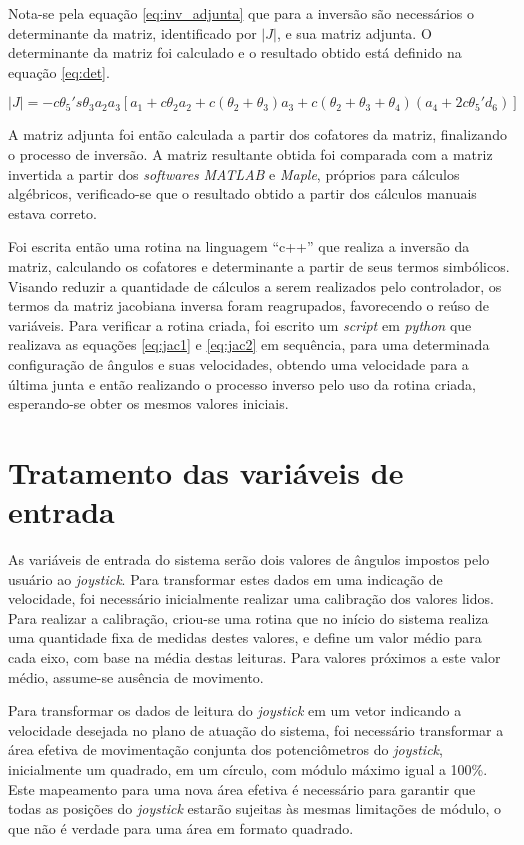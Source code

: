 Nota-se pela equação \ref{eq:inv_adjunta} que para a inversão são necessários o determinante da matriz,
identificado por $|J|$, e sua matriz adjunta. O determinante da matriz foi calculado e o resultado obtido
está definido na equação \ref{eq:det}.

\begin{equation}
    \label{eq:det}
    |J| = -c\theta_5's\theta_3a_2a_3[a_1+c\theta_2a_2+c(\theta_2+\theta_3)a_3+c(\theta_2+\theta_3+\theta_4)(a_4+2c\theta_5'd_6)]  
\end{equation}

A matriz adjunta foi então calculada a partir dos cofatores da matriz, finalizando o 
processo de inversão. 
A matriz resultante obtida foi comparada com a matriz invertida a partir dos \textit{softwares}
\textit{MATLAB} e \textit{Maple}, próprios para cálculos algébricos, verificado-se que o 
resultado obtido a partir dos cálculos manuais estava correto.

Foi escrita então uma rotina na linguagem ``c++'' que realiza a inversão da 
matriz, calculando os cofatores e determinante a partir de seus termos simbólicos. 
Visando reduzir a quantidade de cálculos a serem realizados pelo controlador, os termos da 
matriz jacobiana inversa foram reagrupados, favorecendo o reúso de variáveis.
Para verificar a rotina criada, foi escrito um \textit{script} em \textit{python}
que realizava as equações \ref{eq:jac1} e \ref{eq:jac2} em sequência, para uma 
determinada configuração de ângulos e suas velocidades, obtendo uma velocidade para 
a última junta e então realizando o processo inverso pelo uso da rotina criada, esperando-se 
obter os mesmos valores iniciais.

\section{Tratamento das variáveis de entrada}
As variáveis de entrada do sistema serão dois valores de ângulos impostos pelo
usuário ao \textit{joystick}. Para transformar estes dados em uma indicação de 
velocidade, foi necessário inicialmente realizar uma calibração dos valores lidos.
Para realizar a calibração, criou-se uma rotina que no início do sistema 
realiza uma quantidade fixa de medidas destes valores, e define um valor médio para
cada eixo, com base na média destas leituras. Para valores próximos a este valor médio,
assume-se ausência de movimento.

Para transformar os dados de leitura do \textit{joystick} em um vetor indicando
a velocidade desejada no plano de atuação do sistema, foi necessário transformar
a área efetiva de movimentação conjunta dos potenciômetros do \textit{joystick},
inicialmente um quadrado, em um círculo, com módulo máximo igual a 100\%.
Este mapeamento para uma nova área efetiva é necessário para 
garantir que todas as posições do \textit{joystick} estarão sujeitas às mesmas 
limitações de módulo, o que não é verdade para uma área em formato quadrado.

